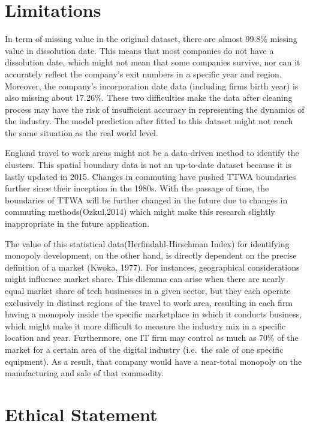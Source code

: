 \documentclass[
  12pt,
  oneside]{book}
\begin{document}
\hypertarget{limitations}{%
\section{Limitations}\label{limitations}}

In term of missing value in the original dataset, there are almost 99.8\% missing value in dissolution date. This means that most companies do not have a dissolution date, which might not mean that some companies survive, nor can it accurately reflect the company's exit numbers in a specific year and region. Moreover, the company's incorporation date data (including firms birth year) is also missing about 17.26\%. These two difficulties make the data after cleaning process may have the risk of insufficient accuracy in representing the dynamics of the industry. The model prediction after fitted to this dataset might not reach the same situation as the real world level.

England travel to work areas might not be a data-driven method to identify the clusters. This spatial boundary data is not an up-to-date dataset because it is lastly updated in 2015. Changes in commuting have pushed TTWA boundaries further since their inception in the 1980s. With the passage of time, the boundaries of TTWA will be further changed in the future due to changes in commuting methods(Ozkul,2014) which might make this research slightly inappropriate in the future application.

The value of this statistical data(Herfindahl-Hirschman Index) for identifying monopoly development, on the other hand, is directly dependent on the precise definition of a market (Kwoka, 1977). For instances, geographical considerations might influence market share. This dilemma can arise when there are nearly equal market share of tech businesses in a given sector, but they each operate exclusively in distinct regions of the travel to work area, resulting in each firm having a monopoly inside the specific marketplace in which it conducts business, which might make it more difficult to measure the industry mix in a specific location and year. Furthermore, one IT firm may control as much as 70\% of the market for a certain area of the digital industry (i.e.~the sale of one specific equipment). As a result, that company would have a near-total monopoly on the manufacturing and sale of that commodity.

\hypertarget{ethical-statement}{%
\section{Ethical Statement}\label{ethical-statement}}
\end{document}
